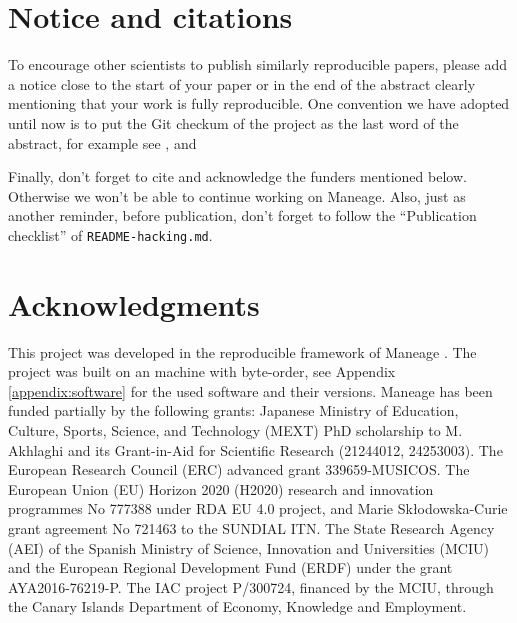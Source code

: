\documentclass[10pt, twocolumn]{article}
\begin{document}
\section{Notice and citations}
To encourage other scientists to publish similarly reproducible papers, please add a notice close to the start of your paper or in the end of the abstract clearly mentioning that your work is fully reproducible.
One convention we have adopted until now is to put the Git checkum of the project as the last word of the abstract, for example see \citet{akhlaghi19}, \citet{infantesainz20} and \citet{maneage}

Finally, don't forget to cite \citet{maneage} and acknowledge the funders mentioned below.
Otherwise we won't be able to continue working on Maneage.
Also, just as another reminder, before publication, don't forget to follow the ``Publication checklist'' of \texttt{README-hacking.md}.





\section{Acknowledgments}

This project was developed in the reproducible framework of Maneage \citep[\emph{Man}aging data lin\emph{eage},][latest Maneage commit \maneageversion{}, from \maneagedate]{maneage}.
The project was built on an {\machinearchitecture} machine with {\machinebyteorder} byte-order, see Appendix \ref{appendix:software} for the used software and their versions.
Maneage has been funded partially by the following grants: Japanese Ministry of Education, Culture, Sports, Science, and Technology (MEXT) PhD scholarship to M. Akhlaghi and its Grant-in-Aid for Scientific Research (21244012, 24253003).
The European Research Council (ERC) advanced grant 339659-MUSICOS.
The European Union (EU) Horizon 2020 (H2020) research and innovation programmes No 777388 under RDA EU 4.0 project, and Marie Sk\l{}odowska-Curie grant agreement No 721463 to the SUNDIAL ITN.
The State Research Agency (AEI) of the Spanish Ministry of Science, Innovation and Universities (MCIU) and the European Regional Development Fund (ERDF) under the grant AYA2016-76219-P.
The IAC project P/300724, financed by the MCIU, through the Canary Islands Department of Economy, Knowledge and Employment.
\end{document}

